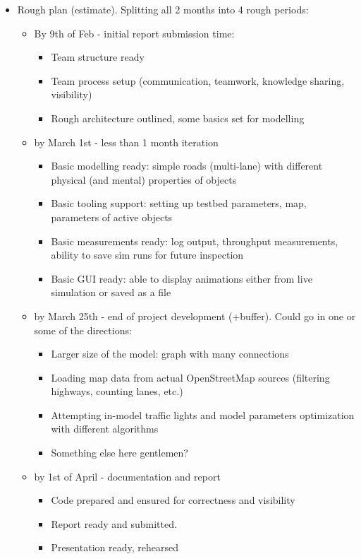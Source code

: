 \begin{itemize}


	\item Rough plan (estimate). Splitting all 2 months into 4 rough periods:
	\begin{itemize}

	    \item By 9th of Feb - initial report submission time:
	    \begin{itemize}
	        \item Team structure ready
	        \item Team process setup (communication, teamwork, knowledge sharing, visibility)
	        \item Rough architecture outlined, some basics set for modelling
	    \end{itemize}

	    \item by March 1st - less than 1 month iteration
	    \begin{itemize}
	        \item Basic modelling ready: simple roads (multi-lane) with different physical (and mental) properties of objects
	        \item Basic tooling support: setting up testbed parameters, map, parameters of active objects
	        \item Basic measurements ready: log output, throughput measurements, ability to save sim runs for future inspection
	        \item Basic GUI ready: able to display animations either from live simulation or saved as a file
	    \end{itemize}

	    \item by March 25th - end of project development (+buffer). Could go in one or some of the directions:
	    \begin{itemize}
	        \item Larger size of the model: graph with many connections
	        \item Loading map data from actual OpenStreetMap sources (filtering highways, counting lanes, etc.)
	        \item Attempting in-model traffic lights and model parameters optimization with different algorithms
	        \item Something else here gentlemen?
	    \end{itemize}

	    \item by 1st of April - documentation and report
	    \begin{itemize}
	        \item Code prepared and ensured for correctness and visibility
	        \item Report ready and submitted.
	        \item Presentation ready, rehearsed
	    \end{itemize}


\end{itemize}
\end{itemize}
